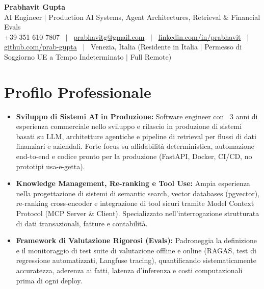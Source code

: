 \documentclass[a4paper,10pt]{article}
\begin{document}
\begin{minipage}[c]{0.80\textwidth}
  {\Huge\bfseries Prabhavit Gupta}\\[3pt]
  {\color{accent}\large AI Engineer $\vert$ Production AI Systems, Agent Architectures, Retrieval $\&$ Financial Evals}\\[6pt]
  {\footnotesize +39 351 610 7807 ~$\vert$~
  \href{mailto:prabhavitg@gmail.com}{prabhavitg@gmail.com} ~$\vert$~
  \href{https://www.linkedin.com/in/prabhavit/}{linkedin.com/in/prabhavit} ~$\vert$~
  \href{https://github.com/prab-gupta}{github.com/prab-gupta} ~$\vert$~
  Venezia, Italia (Residente in Italia $\vert$ Permesso di Soggiorno UE a Tempo Indeterminato $\vert$ Full Remote)}
\end{minipage}\hfill

\vspace{6pt}

\section{Profilo Professionale}
\begin{itemize}
  \item \textbf{Sviluppo di Sistemi AI in Produzione:} Software engineer con ~3 anni di esperienza commerciale nello sviluppo e rilascio in produzione di sistemi basati su LLM, architetture agentiche e pipeline di retrieval per flussi di dati finanziari e aziendali. Forte focus su affidabilità deterministica, automazione end-to-end e codice pronto per la produzione (FastAPI, Docker, CI/CD, no prototipi usa-e-getta).
  \item \textbf{Knowledge Management, Re-ranking e Tool Use:} Ampia esperienza nella progettazione di sistemi di semantic search, vector databases (pgvector), re-ranking cross-encoder e integrazione di tool sicuri tramite Model Context Protocol (MCP Server \& Client). Specializzato nell'interrogazione strutturata di dati transazionali, fatture e contabilità.
  \item \textbf{Framework di Valutazione Rigorosi (Evals):} Padroneggia la definizione e il monitoraggio di test suite di valutazione offline e online (RAGAS, test di regressione automatizzati, Langfuse tracing), quantificando sistematicamente accuratezza, aderenza ai fatti, latenza d'inferenza e costi computazionali prima di ogni deploy.
\end{itemize}

\end{document}
